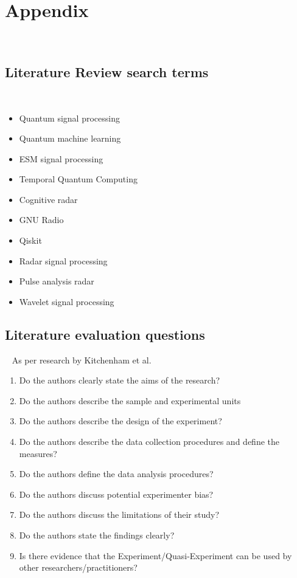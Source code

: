 \section{Appendix}~\label{sec:appendix}
\subsection{Literature Review search terms}~\label{sec:appendix1}
\begin{itemize}
    \item Quantum signal processing
    \item Quantum machine learning
    \item \ac{ESM} signal processing
    \item Temporal Quantum Computing
    \item Cognitive radar
    \item GNU Radio
    \item Qiskit
    \item Radar signal processing
    \item Pulse analysis radar
    \item Wavelet signal processing
\end{itemize}

\subsection{Literature evaluation questions}~\label{sec:appendix2}
As per research by Kitchenham et al. \cite{kitchenham_can_2010}
\begin{enumerate}[label=Q\arabic*]
    \item Do the authors clearly state the aims of the research?
    \item Do the authors describe the sample and experimental units
    \item Do the authors describe the design of the experiment?
    \item Do the authors describe the data collection procedures and define the measures?
    \item Do the authors define the data analysis procedures?
    \item Do the authors discuss potential experimenter bias?
    \item Do the authors discuss the limitations of their study?
    \item Do the authors state the findings clearly?
    \item Is there evidence that the Experiment/Quasi-Experiment can be used by other researchers/practitioners?
\end{enumerate}
